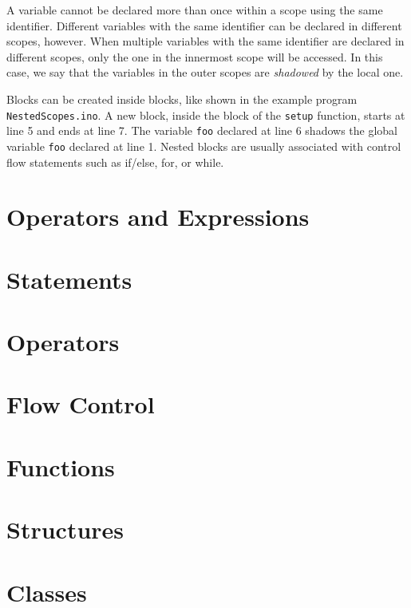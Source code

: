 
A variable cannot be declared more than once within a scope using the same identifier.
Different variables with the same identifier can be declared in different scopes, however.
When multiple variables with the same identifier are declared in different scopes, only the one in the innermost scope will be accessed.
In this case, we say that the variables in the outer scopes are \emph{shadowed} by the local one.

Blocks can be created inside blocks, like shown in the example program \texttt{NestedScopes.ino}.
A new block, inside the block of the \texttt{setup} function, starts at line 5 and ends at line 7.
The variable \texttt{foo} declared at line 6 shadows the global variable \texttt{foo} declared at line 1.
Nested blocks are usually associated with control flow statements such as if/else, for, or while.


\section{Operators and Expressions}

\section{Statements}
\section{Operators}
\section{Flow Control}
\section{Functions}
\section{Structures}
\section{Classes}


